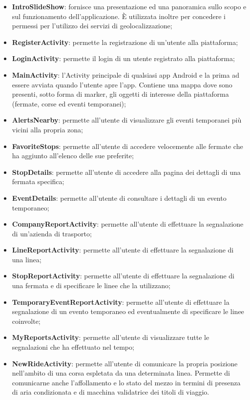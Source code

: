             \begin{itemize}
                \item \textbf{IntroSlideShow}: fornisce una presentazione ed una panoramica sullo scopo e sul funzionamento dell'applicazione. È utilizzata inoltre per concedere i permessi per l'utilizzo dei servizi di geolocalizzazione;
                \item \textbf{RegisterActivity}: permette la registrazione di un'utente alla piattaforma;
                \item \textbf{LoginActivity}: permette il login di un utente registrato alla piattaforma;
                \item \textbf{MainActivity}: l'Activity principale di qualsiasi app Android e la prima ad essere avviata quando l'utente apre l'app. Contiene una mappa dove sono presenti, sotto forma di marker, gli oggetti di interesse della piattaforma (fermate, corse ed eventi temporanei);
                \item \textbf{AlertsNearby}: permette all'utente di visualizzare gli eventi temporanei più vicini alla propria zona;
                \item \textbf{FavoriteStops}: permette all'utente di accedere velocemente alle fermate che ha aggiunto all'elenco delle sue preferite;
                \item \textbf{StopDetails}: permette all'utente di accedere alla pagina dei dettagli di una fermata specifica;
                \item \textbf{EventDetails}: permette all'utente di consultare i dettagli di un evento temporaneo;
                \item \textbf{CompanyReportActivity}: permette all'utente di effettuare la segnalazione di un'azienda di trasporto;
                \item \textbf{LineReportActivity}: permette all'utente di effettuare la segnalazione di una linea;
                \item \textbf{StopReportActivity}: permette all'utente di effettuare la segnalazione di una fermata e di specificare le linee che la utilizzano;
                \item \textbf{TemporaryEventReportActivity}: permette all'utente di effettuare la segnalazione di un evento temporaneo ed eventualmente di specificare le linee coinvolte;
                \item \textbf{MyReportsActivity}: permette all'utente di visualizzare tutte le segnalazioni che ha effettuato nel tempo;
                \item \textbf{NewRideActivity}: permette all'utente di comunicare la propria posizione nell'ambito di una corsa espletata da una determinata linea. Permette di comunicarne anche l'affollamento e lo stato del mezzo in termini di presenza di aria condizionata e di macchina validatrice dei titoli di viaggio.

\end{itemize}
